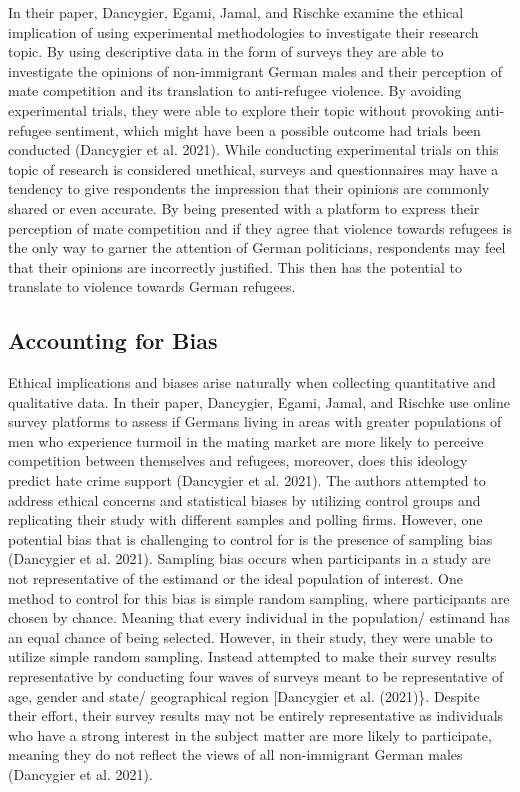 \documentclass[
]{article}
\begin{document}
In their paper, Dancygier, Egami, Jamal, and Rischke examine the ethical
implication of using experimental methodologies to investigate their
research topic. By using descriptive data in the form of surveys they
are able to investigate the opinions of non-immigrant German males and
their perception of mate competition and its translation to anti-refugee
violence. By avoiding experimental trials, they were able to explore
their topic without provoking anti-refugee sentiment, which might have
been a possible outcome had trials been conducted (Dancygier et al.
2021). While conducting experimental trials on this topic of research is
considered unethical, surveys and questionnaires may have a tendency to
give respondents the impression that their opinions are commonly shared
or even accurate. By being presented with a platform to express their
perception of mate competition and if they agree that violence towards
refugees is the only way to garner the attention of German politicians,
respondents may feel that their opinions are incorrectly justified. This
then has the potential to translate to violence towards German refugees.

\hypertarget{accounting-for-bias}{%
\subsection{Accounting for Bias}\label{accounting-for-bias}}

Ethical implications and biases arise naturally when collecting
quantitative and qualitative data. In their paper, Dancygier, Egami,
Jamal, and Rischke use online survey platforms to assess if Germans
living in areas with greater populations of men who experience turmoil
in the mating market are more likely to perceive competition between
themselves and refugees, moreover, does this ideology predict hate crime
support (Dancygier et al. 2021). The authors attempted to address
ethical concerns and statistical biases by utilizing control groups and
replicating their study with different samples and polling firms.
However, one potential bias that is challenging to control for is the
presence of sampling bias (Dancygier et al. 2021). Sampling bias occurs
when participants in a study are not representative of the estimand or
the ideal population of interest. One method to control for this bias is
simple random sampling, where participants are chosen by chance. Meaning
that every individual in the population/ estimand has an equal chance of
being selected. However, in their study, they were unable to utilize
simple random sampling. Instead attempted to make their survey results
representative by conducting four waves of surveys meant to be
representative of age, gender and state/ geographical region
{[}Dancygier et al. (2021)\}. Despite their effort, their survey results
may not be entirely representative as individuals who have a strong
interest in the subject matter are more likely to participate, meaning
they do not reflect the views of all non-immigrant German males
(Dancygier et al. 2021).
\end{document}
